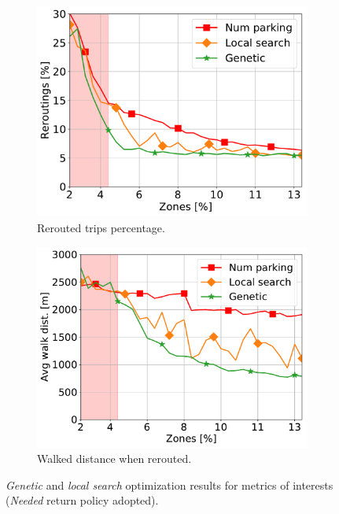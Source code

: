 \begin{figure}[t!]
\begin{center}
\begin{subfigure}{0.49\textwidth}
			\includegraphics[width=\columnwidth]{figures/Needed_ReroutePerc.pdf}
			\caption{Rerouted trips percentage.}
			\label{fig:7_7b_reroute_Needed}
		\end{subfigure}
		\begin{subfigure}{0.49\textwidth}
			\includegraphics[width=\columnwidth]{figures/Needed_AvgWalkedDistance.pdf}
			\caption{Walked distance when rerouted.}
			\label{fig:7_7b_awd_Needed}
		\end{subfigure}         
		\caption{\textit{Genetic} and \textit{local search} optimization results for metrics of interests (\textit{Needed} return policy adopted).}
		\label{fig:7_7b_opt_needed}
	\end{center}
\end{figure}

